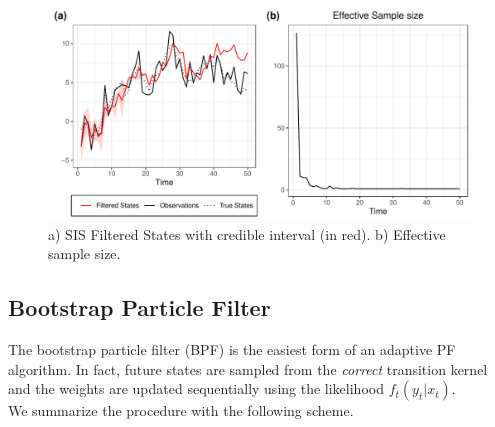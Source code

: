 \documentclass[
]{book}
\theoremstyle{break}
\theoremstyle{nonumberplain}
\begin{document}
\begin{figure}[H]

{\centering \includegraphics{final-draft_files/figure-latex/unnamed-chunk-11-1} 

}

\caption{a) SIS Filtered States with credible interval (in red). b) Effective sample size.}\label{fig:unnamed-chunk-11}
\end{figure}

\subsection{Bootstrap Particle Filter}

The bootstrap particle filter (BPF) is the easiest form of an adaptive
PF algorithm. In fact, future states are sampled from the
\textit{correct} transition kernel and the weights are updated
sequentially using the likelihood \(f_t(y_t|x_t)\).\\
We summarize the procedure with the following scheme.
\end{document}
